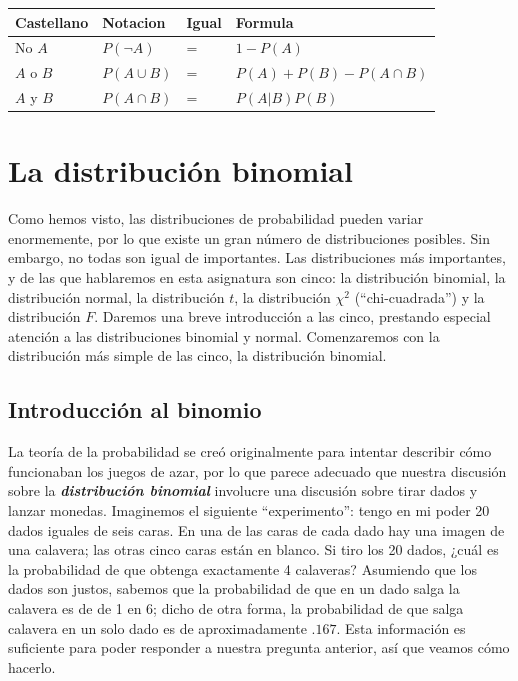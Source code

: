 \documentclass[spanish,]{book}
\begin{document}
\begin{longtable}[]{@{}llll@{}}
\toprule
Castellano & Notacion & Igual & Formula\tabularnewline
\midrule
\endhead
No \(A\) & \(P(\neg A)\) & = & \(1-P(A)\)\tabularnewline
\(A\) o \(B\) & \(P(A \cup B)\) & = &
\(P(A) + P(B) - P(A \cap B)\)\tabularnewline
\(A\) y \(B\) & \(P(A \cap B)\) & = &
\(P(A \vert B) P(B)\)\tabularnewline
\bottomrule
\end{longtable}

\section{La distribución binomial}\label{binomial}

Como hemos visto, las distribuciones de probabilidad pueden variar
enormemente, por lo que existe un gran número de distribuciones
posibles. Sin embargo, no todas son igual de importantes. Las
distribuciones más importantes, y de las que hablaremos en esta
asignatura son cinco: la distribución binomial, la distribución normal,
la distribución \(t\), la distribución \(\chi^2\) (``chi-cuadrada'') y
la distribución \(F\). Daremos una breve introducción a las cinco,
prestando especial atención a las distribuciones binomial y normal.
Comenzaremos con la distribución más simple de las cinco, la
distribución binomial.

\subsection{Introducción al binomio}\label{introduccion-al-binomio}

La teoría de la probabilidad se creó originalmente para intentar
describir cómo funcionaban los juegos de azar, por lo que parece
adecuado que nuestra discusión sobre la \textbf{\emph{distribución
binomial}} involucre una discusión sobre tirar dados y lanzar monedas.
Imaginemos el siguiente ``experimento'': tengo en mi poder 20 dados
iguales de seis caras. En una de las caras de cada dado hay una imagen
de una calavera; las otras cinco caras están en blanco. Si tiro los 20
dados, ¿cuál es la probabilidad de que obtenga exactamente 4 calaveras?
Asumiendo que los dados son justos, sabemos que la probabilidad de que
en un dado salga la calavera es de de 1 en 6; dicho de otra forma, la
probabilidad de que salga calavera en un solo dado es de aproximadamente
\(.167\). Esta información es suficiente para poder responder a nuestra
pregunta anterior, así que veamos cómo hacerlo.
\end{document}
